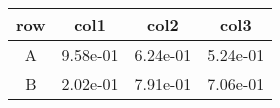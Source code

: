 \begin{tabular}{cccc}
\toprule
row&col1&col2&col3\tabularnewline
\midrule
A&9.58e-01&6.24e-01&5.24e-01\tabularnewline
B&2.02e-01&7.91e-01&7.06e-01\tabularnewline
\bottomrule
\end{tabular}
